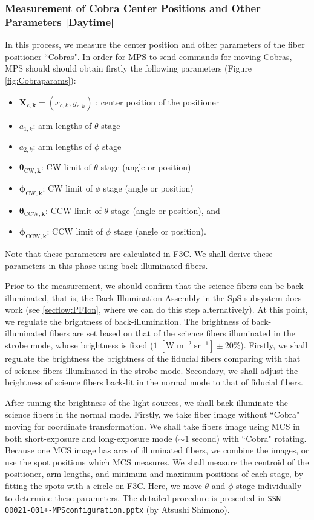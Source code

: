 \subsubsection{Measurement of Cobra Center Positions and Other Parameters [Daytime]}\label{secflow:CobraCal}

In this process, we measure the center position and other parameters of the fiber positioner ``Cobras".
In order for MPS to send commands for moving Cobras, MPS should should obtain firstly the following parameters (Figure \ref{fig:Cobraparams}):
\begin{itemize}
\item $\bm{X_{c,k}}=(x_{c,k}, y_{c,k})$ : center position of the positioner
\item $a_{1,k}$: arm lengths of $\theta$ stage
\item $a_{2,k}$: arm lengths of $\phi$ stage
\item $\bm{\theta _{\mathrm{CW},k}}$: CW limit of $\theta$ stage (angle or position)
\item $\bm{\phi _{\mathrm{CW},k}}$: CW limit of $\phi$ stage (angle or position)
\item $\bm{\theta _{\mathrm{CCW},k}}$: CCW limit of $\theta$ stage (angle or position), and
\item $\bm{\phi_{\mathrm{CCW},k}}$: CCW limit of $\phi$ stage (angle or position).
\end{itemize}
Note that these parameters are calculated in F3C.
We shall derive these parameters in this phase using back-illuminated fibers.

Prior to the measurement, we should confirm that the science fibers can be back-illuminated, that is, the Back Illumination Assembly in the SpS subsystem does work (see \ref{secflow:PFIon}, where we can do this step alternatively).
At this point, we regulate the brightness of back-illumination.
The brightness of back-illuminated fibers are set based on that of the science fibers illuminated in the strobe mode, whose brightness is fixed ($1 \; \mathrm{[W\;m^{-2} \; sr^{-1}]} \pm 20 \%$).
Firstly, we shall regulate the brightness the brightness of the fiducial fibers comparing with that of science fibers illuminated in the strobe mode.
Secondary, we shall adjust the brightness of science fibers back-lit in the normal mode to that of fiducial fibers. 

\smallskip

After tuning the brightness of the light sources, we shall back-illuminate the science fibers in the normal mode.
Firstly, we take fiber image without ``Cobra" moving for coordinate transformation.
We shall take fibers image using MCS in both short-exposure and long-exposure mode ($\sim 1$ second) with ``Cobra" rotating.
Because one MCS image has arcs of illuminated fibers, we combine the images, or use the spot positions which MCS measures.
We shall measure the centroid of the positioner, arm lengths, and minimum and maximum positions of each stage, by fitting the spots with a circle on F3C.
Here, we move $\theta$ and $\phi$ stage individually to determine these parameters.
The detailed procedure is presented in {\tt SSN-00021-001+-MPSconfiguration.pptx} (by Atsushi Shimono).

